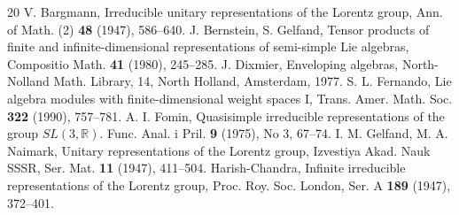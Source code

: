\documentclass[12pt]{amsart}
\theoremstyle{plain} %
\begin{document}
\begin{thebibliography}{20}
 V. Bargmann, Irreducible unitary representations of the Lorentz group, Ann. of Math. (2) \textbf{48} (1947), 586--640.
 J. Bernstein, S. Gelfand, Tensor products of finite and infinite-dimensional representations of semi-simple Lie algebras, Compositio Math. \textbf{41} (1980), 245--285.
 J. Dixmier, Enveloping algebras, North-Nolland Math. Library, 14, North Holland, Amsterdam, 1977.
 S. L. Fernando, Lie algebra modules with finite-dimensional weight spaces I, Trans. Amer. Math. Soc. \textbf{322} (1990), 757--781.
 A. I. Fomin, Quasisimple irreducible representations of the group $SL(3,\mathbb R)$. Func. Anal. i Pril. \textbf{9} (1975), No 3, 67--74.
 I. M. Gelfand, M. A. Naimark, Unitary representations of the Lorentz group, Izvestiya Akad. Nauk SSSR, Ser. Mat. \textbf{11} (1947), 411--504.
 Harish-Chandra, Infinite irreducible representations of the Lorentz group, Proc. Roy. Soc. London, Ser. A \textbf{189} (1947), 372--401.

\end{thebibliography}
\end{document}
